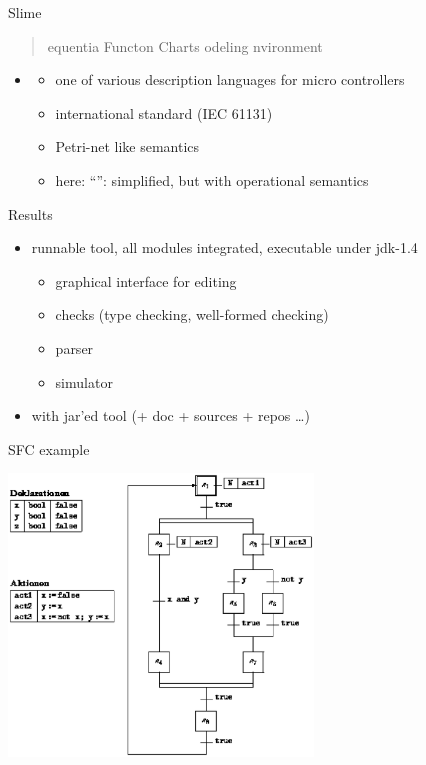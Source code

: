 


\begin{myslide}{Slime}
  \begin{quote}
    equentia Functon Charts
    odeling nvironment
  \end{quote}
  \begin{itemize}
  \item {}
    \begin{itemize}
    \item one of various  description languages for micro
      controllers
    \item international standard (IEC 61131)
    \item  Petri-net like semantics
    \item here: ``'': simplified, but with
       operational semantics
    \end{itemize}
  \end{itemize}
\end{myslide}

\begin{myslide}{Results}
  \begin{itemize}
  \item runnable tool, all modules integrated, executable under jdk-1.4
    \begin{itemize}
    \item graphical interface for editing
    \item checks (type checking, well-formed checking)
    \item parser
    \item simulator
    \end{itemize}
  \item {} with jar'ed tool (+ doc + sources + repos
    \ldots)
  \end{itemize}
\end{myslide}


\begin{myslide}{SFC example}
  

\vspace{-1cm}

  \includegraphics[height=7.5cm]{../requirements/sfc-figure}

\end{myslide}




